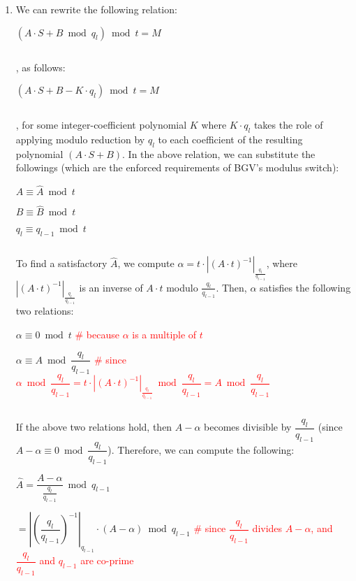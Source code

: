 \begin{myproof}


\begin{enumerate}
\item  We can rewrite the following relation:

$(A\cdot S + B \bmod q_l) \bmod t = M$

$ $

, as follows:

$(A\cdot S + B - K\cdot q_l) \bmod t = M$

$ $

, for some integer-coefficient polynomial $K$ where $K\cdot q_l$ takes the role of applying modulo reduction by $q_l$ to each coefficient of the resulting polynomial $(A\cdot S + B)$. In the above relation, we can substitute the followings (which are the enforced requirements of BGV's modulus switch): 

$A \equiv \hat A \bmod t$

$B \equiv \hat B \bmod t$

$q_{l} \equiv q_{l-1} \bmod t$

$ $


To find a satisfactory $\hat{A}$, we compute $\alpha = t\cdot |(A \cdot t)^{-1}|_{\frac{q_l}{q_{l-1}}}$, where $|(A\cdot t)^{-1}|_{\frac{q_l}{q_{l-1}}}$ is an inverse of $A\cdot t$ modulo $\frac{q_l}{q_{l-1}}$. Then, $\alpha$ satisfies the following two relations: 

$ \alpha \equiv 0 \bmod t$\textcolor{red}{ \# because $\alpha$ is a multiple of $t$}

$\alpha \equiv A \bmod \dfrac{q_l}{q_{l-1}}$ \textcolor{red}{ \# since $\alpha \bmod \dfrac{q_l}{q_{l-1}} = t\cdot | (A \cdot t)^{-1}|_{\frac{q_l}{q_{l-1}}} \bmod \dfrac{q_l}{q_{l-1}} = A \bmod \dfrac{q_l}{q_{l-1}}$}


$ $


If the above two relations hold, then $A - \alpha$ becomes divisible by $\dfrac{q_l}{q_{l-1}}$ (since $A - \alpha \equiv 0 \bmod \dfrac{q_l}{q_{l-1}}$). Therefore, we can compute the following:

$\hat{A} = \dfrac{A - \alpha}{\frac{q_l}{q_{l-1}}} \bmod q_{l-1}$

$ = \left|\left(\dfrac{q_{l}}{q_{l-1}}\right)^{-1}\right|_{q_{l-1}} \cdot (A - \alpha) \bmod q_{l-1}$ 
\textcolor{red}{ \# since $\dfrac{q_l}{q_{l-1}}$ divides $A - \alpha$, and $\dfrac{q_{l}}{q_{l-1}}$ and $q_{l-1}$ are co-prime}


\end{enumerate}
\end{myproof}
